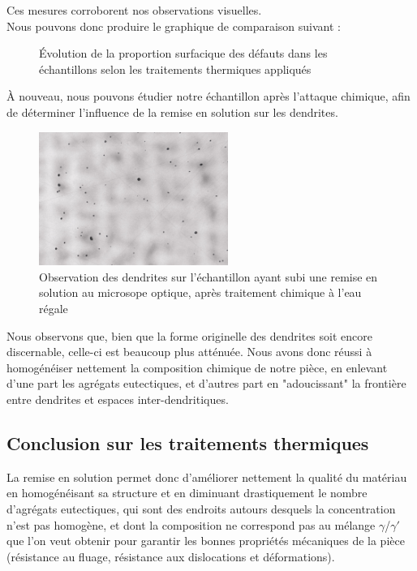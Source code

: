 Ces mesures corroborent nos observations visuelles.\\

Nous pouvons donc produire le graphique de comparaison suivant :


\begin{figure}[H]
    \centering
    
    \caption{Évolution de la proportion surfacique des défauts dans les 
    échantillons selon les traitements thermiques appliqués\\}
    \label{fig:evolution_proportion_defauts_brut_RES}
\end{figure}

À nouveau, nous pouvons étudier notre échantillon après l'attaque chimique, 
afin de déterminer l'influence de la remise en solution sur les dendrites.\\

\begin{figure}[H]
    \centering
    \includegraphics[width = 0.55\textwidth]{images_optique/res_dendrites.pdf}
    \caption{Observation des dendrites sur l'échantillon ayant subi une remise en solution
    au microsope optique, après traitement chimique à l'eau régale\\}
    \label{fig:res_dendrites_optique}
\end{figure}

Nous observons que, bien que la forme originelle des dendrites soit encore discernable, 
celle-ci est beaucoup plus atténuée. Nous avons donc réussi à homogénéiser nettement
la composition chimique de notre pièce, en enlevant d'une part les agrégats eutectiques, 
et d'autres part en "adoucissant" la frontière entre dendrites et espaces inter-dendritiques.


\subsection*{Conclusion sur les traitements thermiques}

La remise en solution permet donc d'améliorer nettement la qualité du matériau en
homogénéisant sa structure et en diminuant drastiquement le nombre d'agrégats
eutectiques, qui sont des endroits autours desquels la concentration n'est pas 
homogène, et dont la composition ne correspond pas au mélange $\gamma$/$\gamma'$
que l'on veut obtenir pour garantir les bonnes propriétés mécaniques de la pièce 
(résistance au fluage, résistance aux dislocations et déformations).



